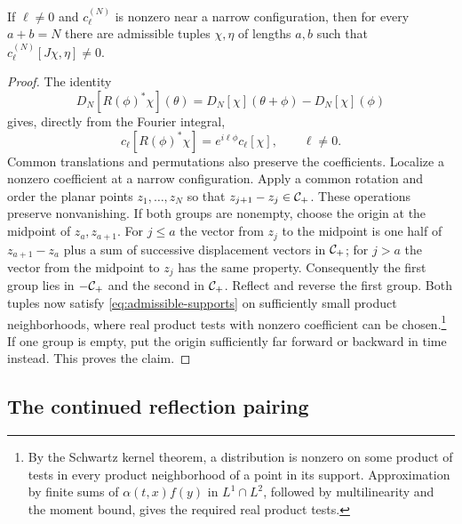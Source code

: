 \begin{lemma}\label{lem:testing}
If $\ell\neq0$ and $c_\ell^{(N)}$ is nonzero near a narrow
configuration, then for every $a+b=N$ there are admissible tuples
$\chi,\eta$ of lengths $a,b$ such that
$c_\ell^{(N)}[J\chi,\eta]\neq0$.
\end{lemma}
\begin{proof}
The identity
\begin{equation}
 D_N[R(\phi)^*\chi](\theta)
   =D_N[\chi](\theta+\phi)-D_N[\chi](\phi)
\end{equation}
gives, directly from the Fourier integral,
\begin{equation}\label{eq:coefficient-rotation}
 c_\ell[R(\phi)^*\chi]=e^{i\ell\phi}c_\ell[\chi],
 \qquad\ell\neq0.
\end{equation}
Common translations and permutations also preserve the coefficients.
Localize a nonzero coefficient at a narrow configuration. Apply a common
rotation and order the planar points $z_1,\ldots,z_N$ so that
$z_{j+1}-z_j\in\mathcal{C}_+$.
These operations preserve nonvanishing. If both groups are nonempty,
choose the origin at the
midpoint of $z_a,z_{a+1}$. For $j\leq a$ the vector from $z_j$ to
the midpoint is one half of $z_{a+1}-z_a$ plus a sum of successive
displacement vectors in $\mathcal{C}_+$; for $j>a$ the vector from the
midpoint to $z_j$ has the same property.
Consequently the first group lies in $-\mathcal{C}_+$ and the second in
$\mathcal{C}_+$. Reflect and reverse the first group. Both tuples now
satisfy \eqref{eq:admissible-supports} on sufficiently small product
neighborhoods, where real product tests with nonzero coefficient
can be chosen.\footnote{By the Schwartz kernel theorem, a distribution
is nonzero on some product of tests in every product neighborhood
of a point in its support. Approximation by finite sums of
$\alpha(t,x)f(y)$ in $L^1\cap L^2$, followed by multilinearity and the
moment bound, gives the required real product tests.}
If one group is empty, put the origin sufficiently far forward or
backward in time instead. This proves the claim.
\end{proof}

\subsection{The continued reflection pairing}\label{subsec:continued-pairing}

